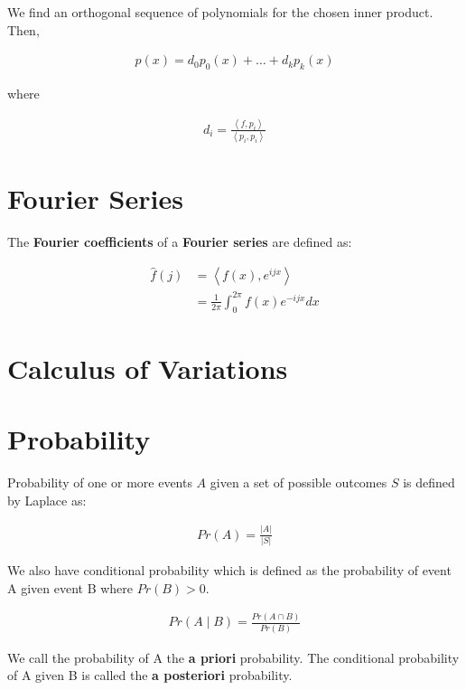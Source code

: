 \documentclass[11pt]{article}
\begin{document}
We find an orthogonal sequence of polynomials for the chosen inner product. Then,

\begin{align*}
    p\left(x\right) = d_{0}p_{0}\left(x\right) + \ldots + d_{k}p_{k}\left(x\right)
\end{align*}

where

\begin{align*}
    d_{i} = \frac{\left\langle f, p_{i} \right\rangle}{\left\langle p_{i}, p_{i} \right\rangle}
\end{align*}

\section{Fourier Series}
\label{sec:orgd9a73db}
The \textbf{Fourier coefficients} of a \textbf{Fourier series} are defined as:

\begin{align*}
    \hat{f}\left(j\right) &= \left\langle f\left(x\right),e^{ijx} \right\rangle \\
    &= \frac{1}{2\pi}\int_{0}^{2\pi} f\left(x\right)e^{-ijx}dx
\end{align*}

\section{Calculus of Variations}
\label{sec:org695a2dc}
\section{Probability}
\label{sec:org852f9e1}
Probability of one or more events \(A\) given a set of possible outcomes \(S\) is defined by Laplace as:

\begin{align*}
    Pr\left(A\right) = \frac{\vert A \vert}{\vert S \vert}
\end{align*}

We also have conditional probability which is defined as the probability of event A given event B where \(Pr\left(B\right) > 0\).

\begin{align*}
     Pr\left(A \mid B\right) = \frac{Pr\left(A \cap B\right)}{Pr\left(B\right)}
\end{align*}

We call the probability of A the \textbf{a priori} probability. The conditional probability of A given B is called the \textbf{a posteriori} probability.
\end{document}

